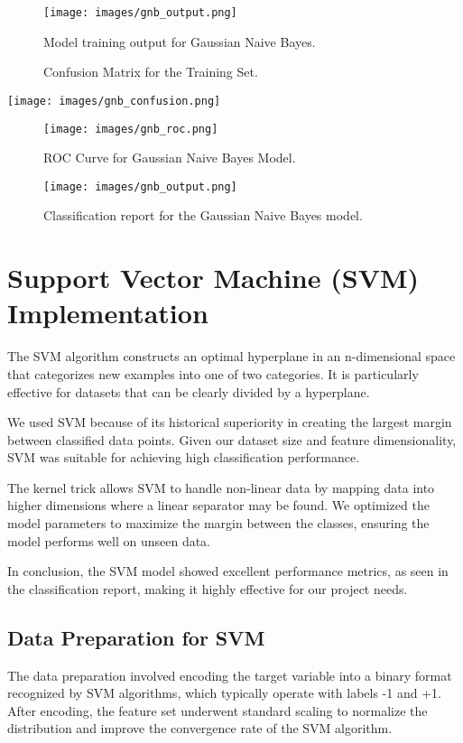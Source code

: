 \documentclass[12pt]{article}
\begin{document}
\begin{figure}[H]
\centering

\caption{Model training output for Gaussian Naive Bayes.}
\texttt{[image: images/gnb\_output.png]}
\end{figure}

\begin{figure}[H]
\centering
\caption{Confusion Matrix for the Training Set.}
\end{figure}
\texttt{[image: images/gnb\_confusion.png]}

\begin{figure}[H]
    \centering
    \texttt{[image: images/gnb\_roc.png]}
    \caption{ROC Curve for Gaussian Naive Bayes Model.}
\end{figure}

\begin{figure}[H]
\centering
\texttt{[image: images/gnb\_output.png]}
\caption{Classification report for the Gaussian Naive Bayes model.}
\end{figure}
\section{Support Vector Machine (SVM) Implementation}

The SVM algorithm constructs an optimal hyperplane in an n-dimensional space that categorizes new examples into one of two categories. It is particularly effective for datasets that can be clearly divided by a hyperplane.

We used SVM because of its historical superiority in creating the largest margin between classified data points. Given our dataset size and feature dimensionality, SVM was suitable for achieving high classification performance.

The kernel trick allows SVM to handle non-linear data by mapping data into higher dimensions where a linear separator may be found. We optimized the model parameters to maximize the margin between the classes, ensuring the model performs well on unseen data.

In conclusion, the SVM model showed excellent performance metrics, as seen in the classification report, making it highly effective for our project needs.

\subsection{Data Preparation for SVM}
The data preparation involved encoding the target variable into a binary format recognized by SVM algorithms, which typically operate with labels -1 and +1. After encoding, the feature set underwent standard scaling to normalize the distribution and improve the convergence rate of the SVM algorithm.
\end{document}
